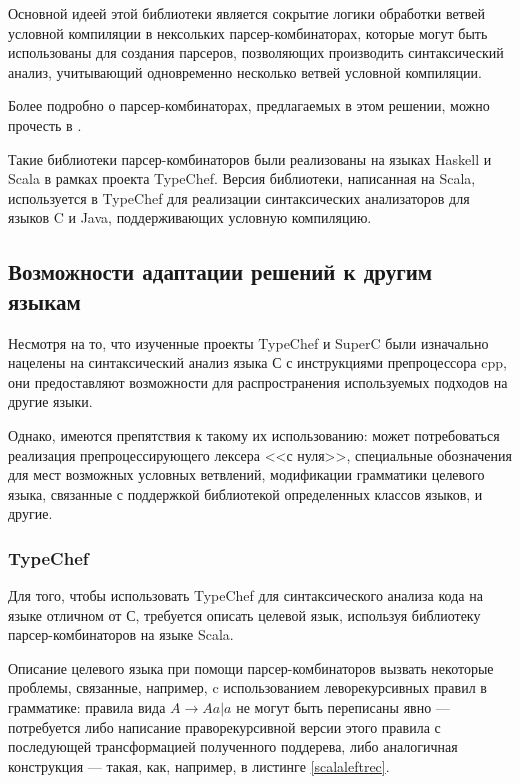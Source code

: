 Основной идеей этой библиотеки является сокрытие логики обработки ветвей условной компиляции в нексольких парсер-комбинаторах, которые могут быть использованы для создания парсеров, позволяющих производить синтаксический анализ, учитывающий одновременно несколько ветвей условной компиляции.

Более подробно о парсер-комбинаторах, предлагаемых в этом решении, можно прочесть в \cite{typechef2}.

Такие библиотеки парсер-комбинаторов были реализованы на языках Haskell и Scala в рамках проекта TypeChef. Версия библиотеки, написанная на Scala, используется в TypeChef для реализации синтаксических анализаторов для языков C и Java, поддерживающих условную компиляцию.

\subsection{Возможности адаптации решений к другим языкам}
\label{subsec:solutionsadaptation}

Несмотря на то, что изученные проекты TypeChef и SuperC были изначально нацелены на синтаксический анализ языка С с инструкциями препроцессора cpp, они предоставляют возможности для распространения используемых подходов на другие языки. 

Однако, имеются препятствия к такому их использованию: может потребоваться реализация препроцессирующего лексера <<с нуля>>, специальные обозначения для мест возможных условных ветвлений, модификации грамматики целевого языка, связанные с поддержкой библиотекой определенных классов языков, и другие.

\subsubsection{TypeChef}

Для того, чтобы использовать TypeChef для синтаксического анализа кода на языке отличном от С, требуется описать целевой язык, используя библиотеку парсер-комбинаторов на языке Scala.

Описание целевого языка при помощи парсер-комбинаторов вызвать некоторые проблемы, связанные, например, c использованием леворекурсивных правил в грамматике: правила вида $A \to A a | a$ не могут быть переписаны явно --- потребуется либо написание праворекурсивной версии этого правила с последующей трансформацией полученного поддерева, либо аналогичная конструкция --- такая, как, например, в листинге \ref{scalaleftrec}.

